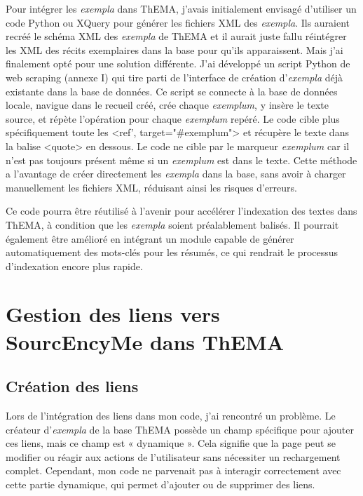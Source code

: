 Pour intégrer les \textit{exempla} dans ThEMA, j'avais initialement envisagé d’utiliser un code Python ou XQuery pour générer les fichiers XML des \textit{exempla}. Ils auraient recréé le schéma XML des \textit{exempla} de ThEMA et il aurait juste fallu réintégrer les XML des récits exemplaires dans la base pour qu'ils apparaissent. Mais j’ai finalement opté pour une solution différente. J’ai développé un script Python de web scraping (annexe I) qui tire parti de l'interface de création d'\textit{exempla} déjà existante dans la base de données. Ce script se connecte à la base de données locale, navigue dans le recueil créé, crée chaque \textit{exemplum}, y insère le texte source, et répète l’opération pour chaque \textit{exemplum} repéré.  Le code cible plus spécifiquement toute les <ref', target="\#exemplum"> et récupère le texte dans la balise <quote> en dessous. Le code ne cible par le marqueur \textit{exemplum} car il n'est pas toujours présent même si un \textit{exemplum} est dans le texte. Cette méthode a l’avantage de créer directement les \textit{exempla} dans la base, sans avoir à charger manuellement les fichiers XML, réduisant ainsi les risques d'erreurs.

Ce code pourra être réutilisé à l'avenir pour accélérer l'indexation des textes dans ThEMA, à condition que les \textit{exempla} soient préalablement balisés. Il pourrait également être amélioré en intégrant un module capable de générer automatiquement des mots-clés pour les résumés, ce qui rendrait le processus d'indexation encore plus rapide.


\section{Gestion des liens vers SourcEncyMe dans ThEMA}
\subsection{Création des liens}
Lors de l'intégration des liens dans mon code, j'ai rencontré un problème. Le créateur d'\textit{exempla} de la base ThEMA possède un champ spécifique pour ajouter ces liens, mais ce champ est « dynamique ». Cela signifie que la page peut se modifier ou réagir aux actions de l'utilisateur sans nécessiter un rechargement complet. Cependant, mon code ne parvenait pas à interagir correctement avec cette partie dynamique, qui permet d'ajouter ou de supprimer des liens. \\
 
